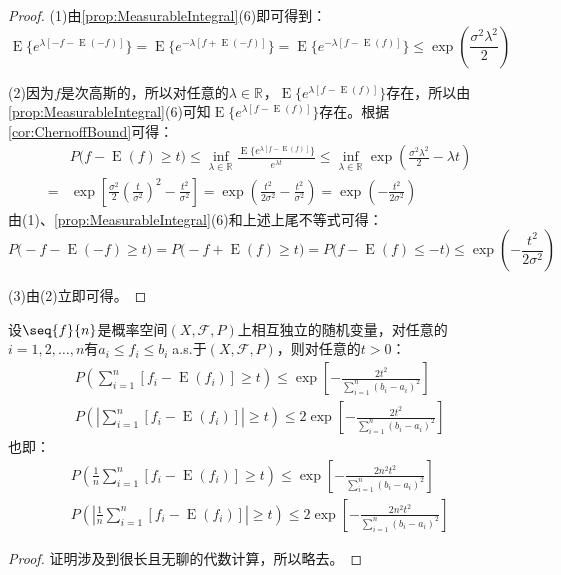 \begin{proof}
	(1)由\cref{prop:MeasurableIntegral}(6)即可得到：
	\begin{equation*}
		\operatorname{E}\{e^{\lambda[-f-\operatorname{E}(-f)]}\}=\operatorname{E}\{e^{-\lambda[f+\operatorname{E}(-f)]}\}=\operatorname{E}\{e^{-\lambda[f-\operatorname{E}(f)]}\}\leqslant\exp\left(\frac{\sigma^2\lambda^2}{2}\right)
	\end{equation*}\par
	(2)因为$f$是次高斯的，所以对任意的$\lambda\in\mathbb{R}^{}$，$\operatorname{E}\{e^{\lambda[f-\operatorname{E}(f)]}\}$存在，所以由\cref{prop:MeasurableIntegral}(6)可知$\operatorname{E}\{e^{\lambda[f-\operatorname{E}(f)]}\}$存在。根据\cref{cor:ChernoffBound}可得：
	\begin{align*}
		&P\Big(f-\operatorname{E}(f)\geqslant t\Big)\leqslant\inf_{\lambda\in\mathbb{R}^{}}\frac{\operatorname{E}\{e^{\lambda[f-\operatorname{E}(f)]}\}}{e^{\lambda t}}\leqslant\inf_{\lambda\in\mathbb{R}^{}}\exp\left(\frac{\sigma^2\lambda^2}{2}-\lambda t\right) \\
		=&\exp\left[\frac{\sigma^2}{2}\left(\frac{t}{\sigma^2}\right) ^2-\frac{t^2}{\sigma^2}\right]=\exp\left(\frac{t^2}{2\sigma^2}-\frac{t^2}{\sigma^2}\right)=\exp\left(-\frac{t^2}{2\sigma^2}\right)
	\end{align*}
	由(1)、\cref{prop:MeasurableIntegral}(6)和上述上尾不等式可得：
	\begin{equation*}
		P\Big(-f-\operatorname{E}(-f)\geqslant t\Big)=P\Big(-f+\operatorname{E}(f)\geqslant t\Big)=P\Big(f-\operatorname{E}(f)\leqslant -t\Big)\leqslant\exp\left(-\frac{t^2}{2\sigma^2}\right)
	\end{equation*}\par
	(3)由(2)立即可得。
\end{proof}
\begin{theorem}\label{theo:HoeffdingBound}
	设$\seq{f}{n}$是概率空间$(X,\mathscr{F},P)$上相互独立的随机变量，对任意的$i=1,2,\dots,n$有$a_i\leqslant f_i\leqslant b_i\;$a.s.于$(X,\mathscr{F},P)$，则对任意的$t>0$：
	\begin{gather*}
		P\left(\sum_{i=1}^{n}[f_i-\operatorname{E}(f_i)]\geqslant t\right)\leqslant\exp\left[-\frac{2t^2}{\sum\limits_{i=1}^{n}(b_i-a_i)^2}\right] \\ P\left(\left|\sum_{i=1}^{n}[f_i-\operatorname{E}(f_i)]\right|\geqslant t\right)\leqslant2\exp\left[-\frac{2t^2}{\sum\limits_{i=1}^{n}(b_i-a_i)^2}\right]
	\end{gather*}
	也即：
	\begin{gather*}
		P\left(\frac{1}{n}\sum_{i=1}^{n}[f_i-\operatorname{E}(f_i)]\geqslant t\right)\leqslant\exp\left[-\frac{2n^2t^2}{\sum\limits_{i=1}^{n}(b_i-a_i)^2}\right] \\ P\left(\left|\frac{1}{n}\sum_{i=1}^{n}[f_i-\operatorname{E}(f_i)]\right|\geqslant t\right)\leqslant2\exp\left[-\frac{2n^2t^2}{\sum\limits_{i=1}^{n}(b_i-a_i)^2}\right]
	\end{gather*}
\end{theorem}
\begin{proof}
	证明涉及到很长且无聊的代数计算，所以略去。
\end{proof}
